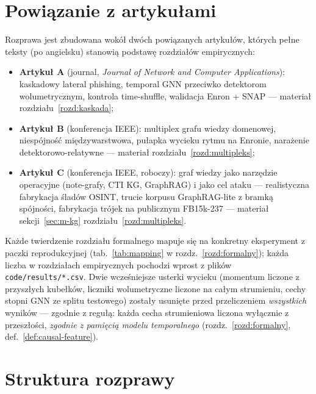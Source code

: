 \section{Powiązanie z artykułami}
\label{sec:w-artykuly}

Rozprawa jest zbudowana wokół dwóch powiązanych artykułów, których
pełne teksty (po angielsku) stanowią podstawę rozdziałów empirycznych:

\begin{itemize}
\item \textbf{Artykuł A} (journal, \emph{Journal of Network and
Computer Applications}): kaskadowy lateral phishing, temporal GNN
przeciwko detektorom wolumetrycznym, kontrola time-shuffle, walidacja
Enron + SNAP --- materiał rozdziału~\ref{rozd:kaskada};
\item \textbf{Artykuł B} (konferencja IEEE): multiplex grafu wiedzy
domenowej, niespójność międzywarstwowa, pułapka wycieku rytmu na
Enronie, narażenie detektorowo-relatywne --- materiał
rozdziału~\ref{rozd:multipleks};
\item \textbf{Artykuł C} (konferencja IEEE, roboczy): graf wiedzy jako
narzędzie operacyjne (note-grafy, CTI KG, GraphRAG) i jako cel ataku ---
realistyczna fabrykacja śladów OSINT, trucie korpusu GraphRAG-lite
z bramką spójności, fabrykacja trójek na publicznym FB15k-237 ---
materiał sekcji~\ref{sec:m-kg} rozdziału~\ref{rozd:multipleks}.
\end{itemize}

Każde twierdzenie rozdziału formalnego mapuje się na konkretny
eksperyment z paczki reprodukcyjnej (tab.~\ref{tab:mapping}
w rozdz.~\ref{rozd:formalny}); każda liczba w rozdziałach empirycznych
pochodzi wprost z plików \texttt{code/results/*.csv}. Dwie wcześniejsze
usterki wycieku (momentum liczone z przyszłych kubełków, liczniki
wolumetryczne liczone na całym strumieniu, cechy stopni GNN ze splitu
testowego) zostały usunięte przed przeliczeniem \emph{wszystkich}
wyników --- zgodnie z regułą: każda cecha strumieniowa liczona
wyłącznie z przeszłości, \emph{zgodnie z pamięcią modelu temporalnego}
(rozdz.~\ref{rozd:formalny}, def.~\ref{def:causal-feature}).

\section{Struktura rozprawy}
\label{sec:w-struktura}

